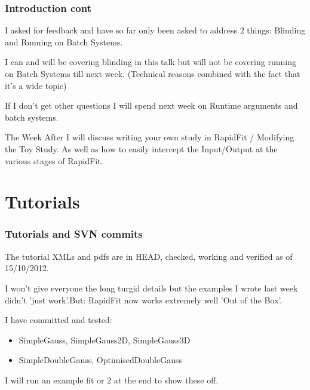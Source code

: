 \documentclass{beamer}
\begin{document}
\begin{frame}
\frametitle{Introduction cont}

I asked for feedback and have so far only been asked to address 2 things:\newline
Blinding and Running on Batch Systems.\newline

I can and will be covering blinding in this talk but will not be covering running on Batch Systems till next week. (Technical reasons combined with the fact that it's a wide topic)\newline

If I don't get other questions I will spend next week on Runtime arguments and batch systems.\newline

The Week After I will discuss writing your own study in RapidFit / Modifying the Toy Study. As well as how to easily intercept the Input/Output at the various stages of RapidFit.



\end{frame}


\section{Tutorials}
\begin{frame}
\frametitle{Tutorials and SVN commits}
The tutorial XMLs and pdfs are in HEAD, checked, working and verified as of 15/10/2012.\newline

I won't give everyone the long turgid details but the examples I wrote last week didn't 'just work'.\newline\newline But: RapidFit now works extremely well 'Out of the Box'.\newline\newline

I have committed and tested:\newline
\begin{itemize}
\item SimpleGauss, SimpleGauss2D, SimpleGauss3D\newline
\item SimpleDoubleGauss, OptimisedDoubleGauss\newline
\end{itemize}

I will run an example fit or 2 at the end to show these off.

\end{frame}
\end{document}
